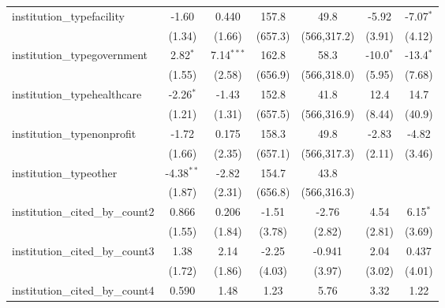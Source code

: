 \begin{tabular}{lcccccc}
   institution\_typefacility             & -1.60         & 0.440         & 157.8         & 49.8         & -5.92         & -7.07$^{*}$\\   
                                         & (1.34)        & (1.66)        & (657.3)       & (566,317.2)  & (3.91)        & (4.12)\\   
   institution\_typegovernment           & 2.82$^{*}$    & 7.14$^{***}$  & 162.8         & 58.3         & -10.0$^{*}$   & -13.4$^{*}$\\   
                                         & (1.55)        & (2.58)        & (656.9)       & (566,318.0)  & (5.95)        & (7.68)\\   
   institution\_typehealthcare           & -2.26$^{*}$   & -1.43         & 152.8         & 41.8         & 12.4          & 14.7\\   
                                         & (1.21)        & (1.31)        & (657.5)       & (566,316.9)  & (8.44)        & (40.9)\\   
   institution\_typenonprofit            & -1.72         & 0.175         & 158.3         & 49.8         & -2.83         & -4.82\\   
                                         & (1.66)        & (2.35)        & (657.1)       & (566,317.3)  & (2.11)        & (3.46)\\   
   institution\_typeother                & -4.38$^{**}$  & -2.82         & 154.7         & 43.8         &               &   \\   
                                         & (1.87)        & (2.31)        & (656.8)       & (566,316.3)  &               &   \\   
   institution\_cited\_by\_count2        & 0.866         & 0.206         & -1.51         & -2.76        & 4.54          & 6.15$^{*}$\\   
                                         & (1.55)        & (1.84)        & (3.78)        & (2.82)       & (2.81)        & (3.69)\\   
   institution\_cited\_by\_count3        & 1.38          & 2.14          & -2.25         & -0.941       & 2.04          & 0.437\\   
                                         & (1.72)        & (1.86)        & (4.03)        & (3.97)       & (3.02)        & (4.01)\\   
   institution\_cited\_by\_count4        & 0.590         & 1.48          & 1.23          & 5.76         & 3.32          & 1.22\\   

\end{tabular}
